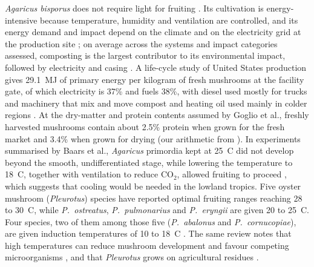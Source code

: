 \textit{Agaricus bisporus} does not require light for fruiting \cite[Abstract, p.~1]{baars2020agaricus}. Its cultivation is energy-intensive because temperature, humidity and ventilation are controlled, and its energy demand and impact depend on the climate and on the electricity grid at the production site \cite[Section~4.1, p.~8]{goglio2024agaricus}; on average across the systems and impact categories assessed, composting is the largest contributor to its environmental impact, followed by electricity and casing \cite[Abstract]{goglio2024agaricus}. A life-cycle study of United States production gives 29.1~MJ of primary energy per kilogram of fresh mushrooms at the facility gate, of which electricity is 37\% and fuels 38\%, with diesel used mostly for trucks and machinery that mix and move compost and heating oil used mainly in colder regions \cite[Sections~2.1, 3.2 and 4.1.1]{robinson2019agaricus}. At the dry-matter and protein contents assumed by Goglio et al., freshly harvested mushrooms contain about 2.5\% protein when grown for the fresh market and 3.4\% when grown for drying (our arithmetic from \cite[Section~4.2, p.~9]{goglio2024agaricus}). In experiments summarised by Baars et al., \textit{Agaricus} primordia kept at 25~\textdegree{}C did not develop beyond the smooth, undifferentiated stage, while lowering the temperature to 18~\textdegree{}C, together with ventilation to reduce CO$_2$, allowed fruiting to proceed \cite[Section~4, p.~10]{baars2020agaricus}, which suggests that cooling would be needed in the lowland tropics. Five oyster mushroom (\textit{Pleurotus}) species have reported optimal fruiting ranges reaching 28 to 30~\textdegree{}C, while \textit{P.~ostreatus}, \textit{P.~pulmonarius} and \textit{P.~eryngii} are given 20 to 25~\textdegree{}C. Four species, two of them among those five (\textit{P.~abalonus} and \textit{P.~cornucopiae}), are given induction temperatures of 10 to 18~\textdegree{}C \cite[Table~1, p.~640]{bellettini2019pleurotus}. The same review notes that high temperatures can reduce mushroom development and favour competing microorganisms \cite[Section~3.1.2, p.~640]{bellettini2019pleurotus}, and that \textit{Pleurotus} grows on agricultural residues \cite[Section~2.1, p.~635]{bellettini2019pleurotus}.%

